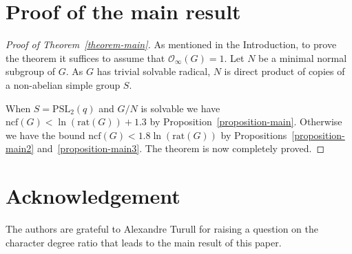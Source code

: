 \documentclass[12pt]{amsart}
\theoremstyle{definition}
\theoremstyle{remark}
\begin{document}
\section{Proof of the main result}

\begin{proof}[Proof of Theorem~\ref{theorem-main}] As mentioned in the Introduction, to prove the theorem it suffices to assume that ${{\mathcal{O}_\infty}}(G)=1$.
Let $N$ be a minimal normal subgroup of $G$. As $G$ has trivial
solvable radical, $N$ is direct product of copies of a non-abelian
simple group $S$.

When $S={{\mathrm {PSL}}}_2(q)$ and $G/N$ is solvable we have
${{\mathrm {ncf}}}(G)<\ln({{\mathrm {rat}}}(G))+1.3$ by Proposition~\ref{proposition-main}.
Otherwise we have the bound ${{\mathrm {ncf}}}(G)<1.8\ln({{\mathrm {rat}}}(G))$ by
Propositions~\ref{proposition-main2} and~\ref{proposition-main3}.
The theorem is now completely proved.
\end{proof}

\section*{Acknowledgement} The authors are grateful to Alexandre Turull for
raising a question on the character degree ratio that leads to the
main result of this paper.
\end{document}
